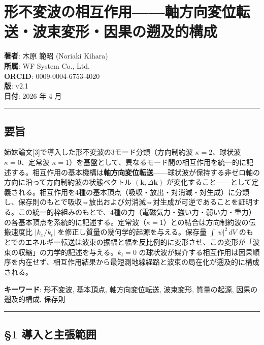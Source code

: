 \documentclass[
  a4paper,11pt]{ltjsarticle}
\theoremstyle{definition}
\theoremstyle{remark}
\begin{document}
\section{形不変波の相互作用------軸方向変位転送・波束変形・因果の遡及的構成}\label{ux5f62ux4e0dux5909ux6ce2ux306eux76f8ux4e92ux4f5cux7528ux8ef8ux65b9ux5411ux5909ux4f4dux8ee2ux9001ux6ce2ux675fux5909ux5f62ux56e0ux679cux306eux9061ux53caux7684ux69cbux6210}

\textbf{著者}: 木原 範昭 (Noriaki Kihara)\\
\textbf{所属}: WF System Co., Ltd.\\
\textbf{ORCID}: 0009-0004-6753-4020\\
\textbf{版}: v2.1\\
\textbf{日付}: 2026 年 4 月

\begin{center}\rule{0.5\linewidth}{0.5pt}\end{center}

\subsection{要旨}\label{ux8981ux65e8}

姉妹論文{[}3{]}で導入した形不変波の3モード分類（方向制約波
\(\kappa = 2\)、球状波 \(\kappa = 0\)、定常波
\(\kappa = 1\)）を基盤として、異なるモード間の相互作用を統一的に記述する。相互作用の基本機構は\textbf{軸方向変位転送}------球状波が保持する非ゼロ軸の方向に沿って方向制約波の状態ベクトル
\((\mathbf{k}, \Delta\mathbf{k})\)
が変化すること------として定義される。相互作用を4種の基本頂点（吸収・放出・対消滅・対生成）に分類し、保存則のもとで吸収⇔放出および対消滅⇔対生成が可逆であることを証明する。この統一的枠組みのもとで、4種の力（電磁気力・強い力・弱い力・重力）の各基本頂点を系統的に記述する。定常波（\(\kappa = 1\)）との結合は方向制約波の伝搬速度比
\(|k_x / k_t|\) を修正し質量の幾何学的起源を与える。保存量
\(\int |\psi|^2 \, dV\)
のもとでのエネルギー転送は波束の振幅と幅を反比例的に変形させ、この変形が「波束の収縮」の力学的記述を与える。\(k_t = 0\)
の球状波が媒介する相互作用は因果順序を内在せず、相互作用結果から最短測地線経路と波束の局在化が遡及的に構成される。

\textbf{キーワード}: 形不変波, 基本頂点, 軸方向変位転送, 波束変形,
質量の起源, 因果の遡及的構成, 保存則

\begin{center}\rule{0.5\linewidth}{0.5pt}\end{center}

\subsection{§1
導入と主張範囲}\label{ux5c0eux5165ux3068ux4e3bux5f35ux7bc4ux56f2}
\end{document}
